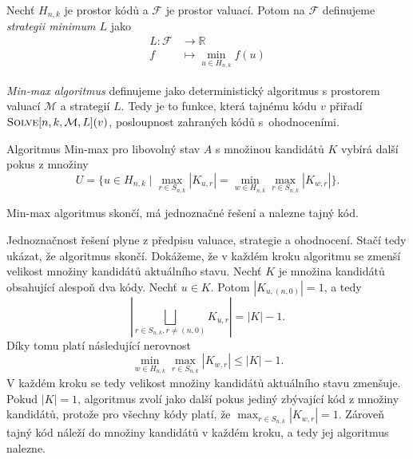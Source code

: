 \begin{definice}
    Nechť $H_{n,k}$ je prostor kódů a $\mathcal{F}$ je prostor valuací. Potom na $\mathcal{F}$ definujeme \emph{strategii minimum $L$} jako
    \begin{align*}
        L \colon \mathcal{F} &\to \mathbb{R} \\
        f &\mapsto \min_{u\in H_{n,k}} f(u)
    \end{align*}
\end{definice}

\begin{definice}
    \emph{Min-max algoritmus} definujeme jako deterministický algoritmus s prostorem valuací $\mathcal{M}$ a strategií $L$. Tedy je to funkce, která tajnému kódu $v$ přiřadí $\textsc{Solve}[n, k, \mathcal{M}, L](v)$, posloupnost zahraných kódů s~ohodnoceními.
\end{definice}



Algoritmus Min-max pro libovolný stav $A$ s množinou kandidátů $K$ vybírá další pokus z množiny
\[U = \{u \in H_{n,k} \mid \max_{r\in S_{n,k}} |K_{u,r}| = \min_{w \in H_{n,k}} \max_{r\in S_{n,k}} |K_{w,r}| \}.\]

\begin{tvrz}
    Min-max algoritmus skončí, má jednoznačné řešení a nalezne tajný kód. 
\end{tvrz}
\begin{dukaz}
    Jednoznačnost řešení plyne z předpisu valuace, strategie a ohodnocení. Stačí tedy ukázat, že algoritmus skončí. Dokážeme, že v každém kroku algoritmu se zmenší velikost množiny kandidátů aktuálního stavu. Nechť $K$ je množina kandidátů obsahující alespoň dva kódy. Nechť $u \in K$. Potom $|K_{u,(n,0)}| = 1$, a tedy 
    \[|\bigsqcup_{r\in S_{n,k}, r \neq (n,0)} K_{u,r} | = |K| - 1.\]
    Díky tomu platí následující nerovnost
    \[\min_{w \in H_{n,k}} \max_{r\in S_{n,k}} |K_{w,r}| \leq |K|-1.\]
    V každém kroku se tedy velikost množiny kandidátů aktuálního stavu zmenšuje. Pokud $|K| = 1$, algoritmus zvolí jako další pokus jediný zbývající kód z množiny kandidátů, protože pro všechny kódy platí, že
    $\max_{r\in S_{n,k}} |K_{w,r}| = 1$.
    Zároveň tajný kód náleží do množiny kandidátů v každém kroku, a tedy jej algoritmus nalezne. 
\end{dukaz}

